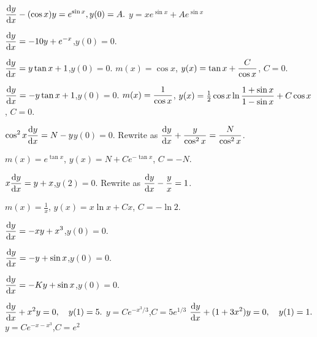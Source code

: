 \begin{multicols}{2}
\problem \(\displaystyle \frac{\mathrm{d} y}{\mathrm{d} x} - (\cos x)y = e^{\sin x}, y(0)=A.  \) %
\answer %
$y=xe^{\sin x}+Ae^{\sin x}$
\endanswer

\problem $\displaystyle \frac{\mathrm{d} y} {\mathrm{d} x} = -10y + e^{-x}$,\quad $y(0)=0$. %

\problem $\displaystyle \frac{\mathrm{d} y} {\mathrm{d} x} =y \tan x + 1$,\quad $y(0)=0$. %
\answer %
$m(x) = \cos x$, $\displaystyle y(x) = \tan x + \frac{C} {\cos x}$, $C=0$.
\endanswer

\problem $\displaystyle \frac{\mathrm{d} y} {\mathrm{d} x} = -y\tan x + 1$,\quad $y(0)=0$. %
\answer %
$\displaystyle m(x) = \frac{1} {\cos x}$, $\displaystyle y(x) = \tfrac12\cos x \ln\frac{1+\sin x} {1-\sin
x} + C\cos x $, $C=0$.
\endanswer

\problem $\displaystyle \cos^2 x \frac{\mathrm{d} y} { \mathrm{d} x} =N-y$\quad $y(0)=0$. %
\answer %
Rewrite as $\displaystyle  \frac{\mathrm{d} y} { \mathrm{d} x} +\frac{y}{\cos^2 x} =\frac {N}{\cos^2 x}$.

$m(x) = e^{\tan x}$,  $y(x) = N + C e^{-\tan x}$, $C = -N$.
\endanswer

\problem $\displaystyle x\frac{\mathrm{d} y} {\mathrm{d} x} = y+x $,\quad $y(2)=0$. %
\answer %
Rewrite as $\displaystyle  \frac{\mathrm{d} y} { \mathrm{d} x} - \frac{y}{x} = 1$.

$m(x) = \frac{1} {x}$,  $y(x) = x\ln x +  C x$, $C = -\ln 2$.
\endanswer

\problem $\displaystyle \frac{\mathrm{d} y} {\mathrm{d} x} = -x y + x^3$,\quad $y(0)=0$. %

\problem $\displaystyle \frac{\mathrm{d} y} {\mathrm{d} x} = -y + \sin x $,\quad $y(0)=0$. %

\problem $\displaystyle \frac{\mathrm{d} y} {\mathrm{d} x} = -Ky + \sin x$,\quad $y(0)=0$. %

\problem \(\displaystyle \frac{\mathrm{d} y}{\mathrm{d} x} + x^2y =0,\quad y(1)=5. \) %
\answer %
$y=Ce^{-x^3/3}$,\quad $C = 5e^{1/3}$
\endanswer
\problem \(\displaystyle \frac{\mathrm{d} y}{\mathrm{d} x} + (1+3x^2)y =0,\quad y(1)=1.  \) %
\answer %
$y=Ce^{-x-x^3}$,\quad $C=e^2$
\endanswer



\end{multicols}
\noproblemfont

